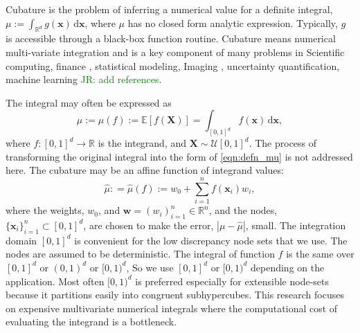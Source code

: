 \documentclass{iitthesis}          %
\newcommand{\bm}[1]{\boldsymbol{#1}}
\newcommand{\dif}[1]{\text{d}{#1}}
\newcommand{\reals}{\mathbb{R}}
\newcommand{\Ex}{\mathbb{E}}
\newcommand{\vw}{\bm{w}}
\newcommand{\vx}{\bm{x}}
\newcommand{\dvx}{\dif{\bm{x}}}
\newcommand{\hmu}{\widehat{\mu}}
\def\abs#1{\ensuremath{\left \lvert #1 \right \rvert}}
\newcommand{\JRNote}[1]{{\textcolor{green}{JR: #1}}}
\begin{document}
\begin{abstract}
\end{abstract}


\textpages     %




\label{intro}

Cubature is the problem of inferring a numerical value for a definite integral, 
$ \mu := \int_{\reals^d} g(\vx) \, \dif \vx$, where $\mu$ has no closed form analytic expression. Typically, $g$ is accessible through a black-box function routine. 
Cubature means numerical multi-variate integration and is a key component of many problems in Scientific computing, finance \cite{Gla03}, statistical modeling, Imaging \cite{Keller2013}, uncertainty quantification, machine learning \cite{Goodfellow-et-al-2016} \JRNote{add references}.  

The integral may often be expressed as
\begin{equation}
\label{eqn:defn_mu}
\mu:= \mu(f) := \Ex[f(\boldsymbol{X})] = \int_{[0,1]^d} f(\vx)\, \dvx, 
\end{equation}
where $f:[0,1]^d \to \reals$ is the integrand, and $\boldsymbol{X} \sim \mathcal{U}[0,1]^d$.  The process of transforming the original integral into the form of \eqref{eqn:defn_mu}  is not addressed here.  The cubature may be an affine function of integrand values:
\begin{equation}
\label{eqn:defn_hmu}  %
\hmu: = \hmu(f) := w_0 + \sum_{i=1}^{n} f(\vx_i) w_i,
\end{equation}
where the weights, $w_0$, and  $\vw = (w_i)_{i=1}^n \in \reals^n$, and the nodes, $\{\vx_i\}_{i=1}^n \subset [0,1]^d$, are chosen to make the error, $\abs{\mu - \hmu}$, small. The integration domain $[0,1]^d$ is convenient for the low discrepancy node sets that we use.  The nodes are assumed to be deterministic.
The integral of function $f$ is the same over $[0, 1]^d$ or $(0, 1)^d$ or $[0, 1)^d$, So we use $[0, 1]^d$ or $[0, 1)^d$ depending on the application. Most often $[0, 1)^d$ is preferred especially for extensible node-sets because  it partitions easily into congruent subhypercubes.
This research focuses on expensive multivariate numerical integrals 
where the computational cost of evaluating the integrand is a  bottleneck.

\end{document}
